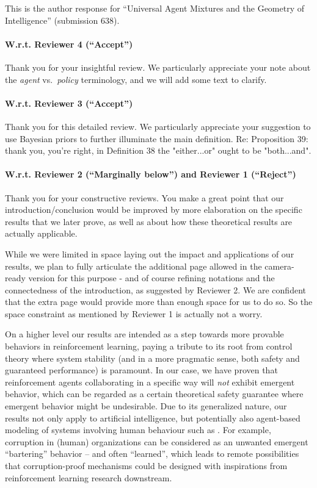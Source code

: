 \documentclass{article}
\begin{document}
This is the author response for ``Universal Agent Mixtures and the Geometry of Intelligence''
(submission 638).

\paragraph{W.r.t. Reviewer 4 (``Accept'')}

Thank you for your insightful review. We particularly appreciate your note about the \emph{agent} vs.\ \emph{policy} terminology, and we will add some text to clarify.

\paragraph{W.r.t. Reviewer 3 (``Accept'')}

Thank you for this detailed review. We particularly appreciate your suggestion to use Bayesian priors to further illuminate the main definition. Re: Proposition 39: thank you, you're right, in Definition 38 the "either...or" ought to be "both...and".

\paragraph{W.r.t. Reviewer 2 (``Marginally below'') and Reviewer 1 (``Reject'')}

Thank you for your constructive reviews. You make a great point that our introduction/conclusion would
be improved by more elaboration on the specific results that we later prove, as well as
about how these theoretical results are actually applicable.

While we were limited in space laying out the impact and
applications
of our results, we plan to fully articulate the additional page
allowed in the camera-ready version for this purpose - and of course refining notations and the connectedness of the introduction, as suggested by Reviewer 2.
We are confident that the extra page would provide more than enough space for us to do so. So the space constraint as mentioned by Reviewer 1 is actually not a worry.

On a higher level our results are intended as a step towards more provable behaviors in reinforcement learning,
paying a tribute to its root from control theory where system stability (and in a more pragmatic sense,
both safety and guaranteed performance)
is paramount.
In our case, we have proven that reinforcement agents collaborating
in a specific way will \emph{not} exhibit emergent behavior, which
can be regarded as a certain theoretical safety guarantee where emergent behavior might be undesirable.
Due to its generalized nature, our results not only apply to artificial intelligence,
but potentially also agent-based modeling of
systems involving human behaviour such as \cite{Bouarfa2013AgentbasedMA}.
For example, corruption in (human) organizations can be considered
as an unwanted emergent ``bartering'' behavior -- and often ``learned'', which leads to remote possibilities that corruption-proof mechanisms could be designed with inspirations from reinforcement learning research downstream.
\end{document}
